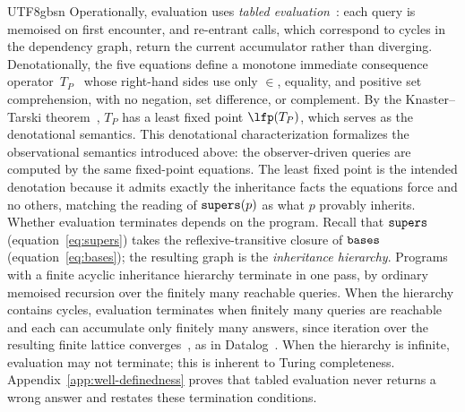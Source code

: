 \begin{CJK*}{UTF8}{gbsn}
Operationally, evaluation uses \emph{tabled
evaluation}~\cite{tamaki1986-tabled-resolution}:
each query is memoised on first encounter, and
re-entrant calls, which correspond to cycles in the dependency graph,
return the current accumulator rather than diverging.
Denotationally, the five equations define a monotone
immediate consequence
operator~$T_P$~\cite{vanemden1976-predicate-logic-semantics}
whose right-hand sides use only $\in$, equality, and
positive set comprehension, with no negation, set
difference, or complement.
By the Knaster--Tarski
theorem~\cite{tarski1955-lattice-fixpoint-theorem}, $T_P$ has a
least fixed point $\lfp(T_P)$, which serves as
the denotational semantics.
This denotational characterization formalizes the observational
semantics introduced above: the observer-driven queries are
computed by the same fixed-point equations. The least fixed
point is the intended denotation because it admits exactly the
inheritance facts the equations force and no others, matching
the reading of $\mathtt{supers}(p)$ as what $p$ provably inherits.
Whether evaluation terminates depends on the program.
Recall that $\mathtt{supers}$ (equation~\ref{eq:supers}) takes the
reflexive-transitive closure of $\mathtt{bases}$
(equation~\ref{eq:bases}); the resulting graph is the
\emph{inheritance hierarchy}.
Programs with a finite acyclic inheritance hierarchy terminate in
one pass, by ordinary memoised recursion over the finitely many
reachable queries.
When the hierarchy contains cycles,
evaluation terminates when finitely many queries are
reachable and each can accumulate only finitely many answers, since
iteration over the resulting finite
lattice converges~\cite{bancilhon1986-recursive-query-strategies},
as in Datalog~\cite{vanemden1976-predicate-logic-semantics}.
When the hierarchy is infinite, evaluation may
not terminate; this is inherent to Turing completeness.
Appendix~\ref{app:well-definedness} proves that tabled
evaluation never returns a wrong answer and restates
these termination conditions.
\fi


\end{CJK*}
